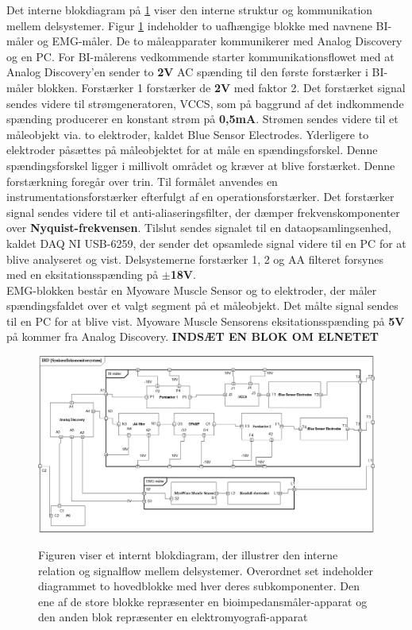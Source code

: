 Det interne blokdiagram på \ref{ibdfigur} viser den interne struktur og kommunikation mellem delsystemer. Figur \ref{ibdfigur} indeholder to uafhængige blokke med navnene BI-måler og EMG-måler. De to måleapparater kommunikerer med Analog Discovery og en PC. For BI-målerens vedkommende starter kommunikationsflowet med at Analog Discovery'en sender to \textbf{2V} AC spænding til den første forstærker i BI-måler blokken. Forstærker 1 forstærker de \textbf{2V} med faktor 2. Det forstærket signal sendes videre til strømgeneratoren, VCCS, som på baggrund af det indkommende spænding producerer en konstant strøm på \textbf{0,5mA}. Strømen sendes videre til et måleobjekt via. to elektroder, kaldet Blue Sensor Electrodes.       Yderligere to elektroder påsættes på måleobjektet for at måle en spændingsforskel. Denne spændingsforskel ligger i millivolt området og kræver at blive forstærket. Denne forstærkning foregår over trin. Til formålet anvendes en instrumentationsforstærker efterfulgt af en operationsforstærker. Det forstærker signal sendes videre til et anti-aliaseringsfilter, der dæmper frekvenskomponenter over \textbf{Nyquist-frekvensen}. Tilslut sendes signalet til en dataopsamlingsenhed, kaldet DAQ NI USB-6259, der sender det opsamlede signal videre til en PC for at blive analyseret og vist. Delsystemerne forstærker 1, 2 og AA filteret forsynes med en eksitationsspænding på $ \pm  $\textbf{18V}. \\

EMG-blokken består en Myoware Muscle Sensor og to elektroder, der måler spændingsfaldet over et valgt segment på et måleobjekt. Det målte signal sendes til en PC for at blive vist. Myoware Muscle Sensorens eksitationsspænding på \textbf{5V} på  kommer fra Analog Discovery.   
					\textbf{INDSÆT EN BLOK OM ELNETET} 
\begin{figure}[H]
\centering
{\includegraphics[width=\linewidth]
{Figure/IBDDpng}}
\caption{Figuren viser et internt blokdiagram, der illustrer den interne relation og signalflow mellem delsystemer. Overordnet set indeholder diagrammet to hovedblokke med hver deres subkomponenter. Den ene af de store blokke repræsenter en bioimpedansmåler-apparat og den anden blok repræsenter en elektromyografi-apparat }
\label{ibdfigur}
\end{figure}

